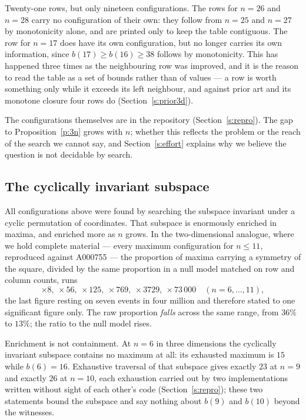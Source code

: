\documentclass[11pt,a4paper]{article}
\begin{document}
Twenty-one rows, but only nineteen configurations.  The rows
for $n=26$ and $n=28$ carry no configuration of their own: they follow from $n=25$ and $n=27$ by
monotonicity alone, and are printed only to keep the table contiguous.  The row for $n=17$ does
have its own configuration, but no longer carries its own information, since $b(17)\ge b(16)\ge38$ follows by monotonicity.  This has happened three
times as the neighbouring row was improved, and it is the reason to read the table as a set of
bounds rather than of values --- a row is worth something only while it exceeds its left neighbour, and
against prior art and its monotone closure four rows do (Section~\ref{s:prior3d}).

The configurations themselves are in the repository (Section~\ref{s:repro}).  The gap to
Proposition~\ref{p:3n} grows with $n$; whether this reflects the problem or the reach of the
search we cannot say, and Section~\ref{s:effort} explains why we believe the question is not
decidable by search.

\subsection{The cyclically invariant subspace}\label{s:subspace}
All configurations above were found by searching the subspace invariant under a cyclic
permutation of coordinates.  That subspace is enormously enriched in maxima, and enriched more
as $n$ grows.  In the two-dimensional analogue, where we hold complete material --- every maximum
configuration for $n\le11$, reproduced against A000755 --- the proportion of maxima carrying a
symmetry of the square, divided by the same proportion in a null model matched on row and column
counts, runs
\[\times8,\ \times56,\ \times125,\ \times769,\ \times3729,\ \times73\,000\quad (n=6,\dots,11),\]
the last figure resting on seven events in four million and therefore stated to one significant
figure only.  The raw proportion \emph{falls} across the same range, from $36\%$ to $13\%$; the
ratio to the null model rises.

Enrichment is not containment.  At $n=6$ in three dimensions the cyclically invariant subspace
contains no maximum at all: its exhausted maximum is $15$ while $b(6)=16$.  Exhaustive traversal
of that subspace gives exactly $23$ at $n=9$ and exactly $26$ at $n=10$, each exhaustion carried out by two
implementations written without sight of each other's code (Section~\ref{s:repro}); these two statements bound the
subspace and say nothing about $b(9)$ and $b(10)$ beyond the witnesses.
\end{document}
